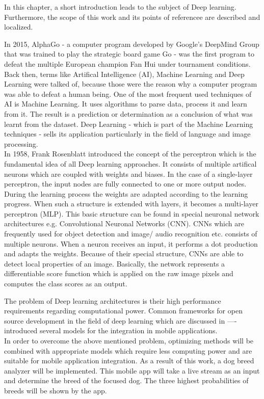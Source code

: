 In this chapter, a short introduction leads to the subject of Deep learning. Furthermore, the scope of this work and its points of referencee are described and localized. 
		
In 2015, AlphaGo - a computer program developed by Google's DeepMind Group that was trained to play the strategic board game Go - was the first program to defeat the multiple European champion Fan Hui under tournament conditions. Back then, terms like Artifical Intelligence (AI), Machine Learning and Deep Learning were talked of, because those were the reason why a computer program was able to defeat a human being. One of the most frequent used techniques of AI is Machine Learning. It uses algorithms to parse data, process it and learn from it. The result is a prediction or determination as a conclusion of what was learnt from the dataset. Deep Learning - which is part of the Machine Learning techniques - sells its application particularly in the field of language and image processing. \\

In 1958, Frank Rosenblatt introduced the concept of the perceptron which is the fundamental idea of all Deep learning approaches. It consists of multiple artifical neurons which are coupled with weights and biases. In the case of a single-layer perceptron, the input nodes are fully connected to one or more output nodes. During the learning process the weights are adapted according to the learning progress. When such a structure is extended with layers, it becomes a multi-layer perceptron (MLP). This basic structure can be found in special neuronal network architectures e.g. Convolutional Neuronal Networks (CNN). CNNs which are frequently used for object detection and image/ audio recognition etc. consists of multiple neurons. When a neuron receives an input, it performs a dot production and adapts the weights. Because of their special structure, CNNs are able to detect local properties of an image. Basically, the network represents a differentiable score function which is applied on the raw image pixels and computes the class scores as an output.
 
The problem of Deep learning architectures is their high performance requirements regarding computational power. Common frameworks for open source development in the field of deep learning which are discussed in ---- introduced several models for the integration in mobile applications. \\

In order to overcome the above mentioned problem, optimizing methods will be combined with appropriate models which require less computing power and are suitable for mobile application integration. As a result of this work, a dog breed analyzer will be implemented. This mobile app will take a live stream as an input and determine the breed of the focused dog. The three highest probabilities of breeds will be shown by the app.

	